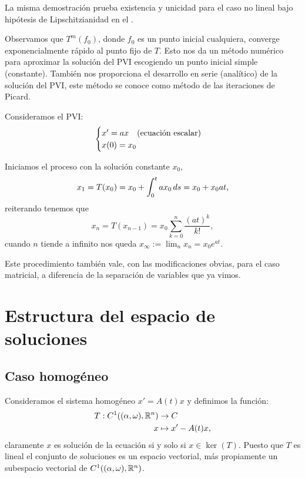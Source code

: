 \documentclass[../ecuaciones_diferenciales.tex]{subfiles}
\begin{document}
\begin{remark}
	La misma demostración prueba existencia y unicidad para el caso no lineal bajo
	hipótesis de Lipschitzianidad en el .
\end{remark}

Observamos que \(T^m(f_0)\), donde \(f_0\) es un punto inicial cualquiera,
converge exponencialmente rápido al punto fijo de \(T\). Esto nos da un método
numérico para aproximar la solución del PVI escogiendo un punto inicial simple
(constante). También nos proporciona el desarrollo en serie (analítico) de la
solución del PVI, este método se conoce como método de las iteraciones de
Picard.

\begin{example}
	Consideramos el PVI:
	\[\begin{cases}x' = ax \quad \text{(ecuación escalar)} \\
			x(0) = x_0\end{cases}\]

	Iniciamos el proceso con la solución constante \(x_0\),
	\[x_1 = T(x_0) = x_0 + \int_0^t a x_0 \mathop{d\!} s = x_0 + x_0 a t,\]
	reiterando tenemos que
	\[x_n = T(x_{n - 1}) = x_0 \sum_{k = 0}^n \frac{(at)^k}{k!},\] cuando \(n\)
	tiende a infinito nos queda \(x_\infty := \lim_n x_n = x_0 e^{at}\).
\end{example}

\begin{remark}
	Este procedimiento también vale, con las modificaciones obvias, para el caso
	matricial, a diferencia de la separación de variables que ya vimos.
\end{remark}

\section{Estructura del espacio de soluciones}

\subsection{Caso homogéneo}

Consideramos el sistema homogéneo \(x' = A(t) x\) y definimos la función:
\begin{align*}
	T : C^1((\alpha, \omega), \mathbb{R}^n) & \to C               \\
	x                               & \mapsto x' - A(t)x,
\end{align*}
claramente \(x\) es solución de la ecuación si y solo si \(x \in \ker(T)\).
Puesto que \(T\) es lineal el conjunto de soluciones es un espacio vectorial,
más propiamente un subespacio vectorial de \(C^1((\alpha, \omega), \mathbb{R}^n)\).
\end{document}
